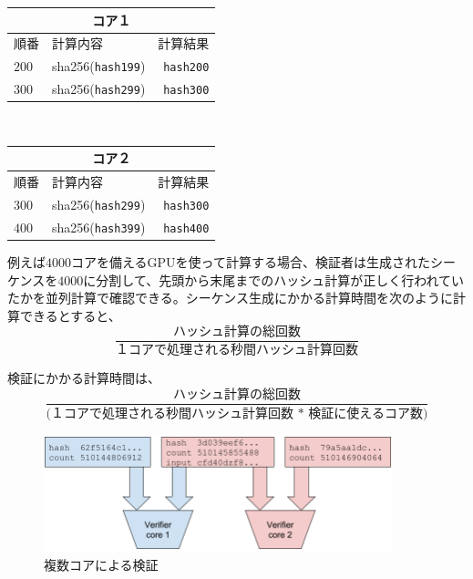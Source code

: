 \documentclass[12pt]{ltjsarticle}
\begin{document}
\begin{center}

\begin{tabular}{l l r}
    \multicolumn{3}{c}{コア１} \\ \hline
    順番  & 計算内容 & 計算結果 \\ \hline
    $200$ & sha256(\texttt{hash199}) & \texttt{hash200} \\ 
    $300$ & sha256(\texttt{hash299}) & \texttt{hash300}\\ 
    \end{tabular}\\
    
  \begin{tabular}{l l r}
    \multicolumn{3}{c}{コア２} \\
    \hline
    順番  & 計算内容 & 計算結果 \\ \hline
    $300$ & sha256(\texttt{hash299}) & \texttt{hash300} \\
    $400$ & sha256(\texttt{hash399}) & \texttt{hash400}\\ 
    \end{tabular}
    
\end{center}


例えば$4000$コアを備えるGPUを使って計算する場合、検証者は生成されたシーケンスを$4000$に分割して、先頭から末尾までのハッシュ計算が正しく行われていたかを並列計算で確認できる。シーケンス生成にかかる計算時間を次のように計算できるとすると、\\


\[
\frac{\textrm{ハッシュ計算の総回数}}{\textrm{１コアで処理される秒間ハッシュ計算回数}}
\]

\noindent 検証にかかる計算時間は、\\

\[
\frac{\textrm{ハッシュ計算の総回数}}{\textrm{(１コアで処理される秒間ハッシュ計算回数 * 検証に使えるコア数)}}
\]

\begin{figure}
  \begin{center}
    \centering
    \includegraphics[width=0.9\textwidth]{../../figures/fig_4.png}
    \caption[Figure 4]{複数コアによる検証\label{fig:poh_verify}}
  \end{center}
  \end{figure}
\end{document}
